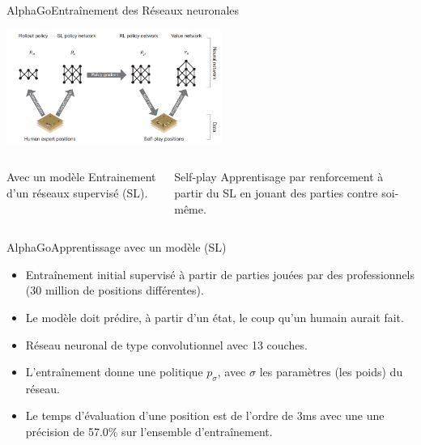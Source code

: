 \begin{frame}{AlphaGo}{Entraînement des Réseaux neuronales}
	\begin{center}
		\includegraphics[width=7cm]{ressources/Entrainement}
		\begin{columns}[t]
			\begin{column}{.4\textwidth}
				\begin{block}{Avec un modèle}
					Entrainement d'un réseaux supervisé (SL).
				\end{block}
			\end{column}
			\begin{column}{.4\textwidth}
				\begin{block}{Self-play}
					Apprentisage par renforcement à partir du SL en jouant des parties contre soi-même.
				\end{block}
			\end{column}
		\end{columns}

	\end{center}

\end{frame}


\begin{frame}{AlphaGo}{Apprentissage avec un modèle (SL)}

	\begin{itemize}
		\item Entraînement initial supervisé à partir de parties jouées par des professionnels (30 million de positions différentes).
		\item Le modèle doit prédire, à partir d'un état, le coup qu'un humain aurait fait.
		\item Réseau neuronal de type convolutionnel avec 13 couches.
		\item L’entraînement donne une politique $p_\sigma$, avec $\sigma$ les paramètres (les poids) du réseau.
		\item Le temps d'évaluation d'une position est de l'ordre de 3ms avec une une précision de 57.0\% sur l'ensemble d’entraînement.
	\end{itemize}

\end{frame}


